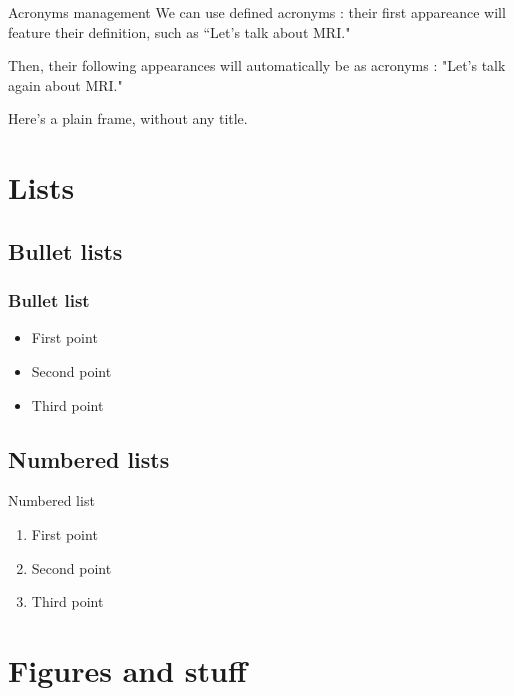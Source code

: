 \documentclass[
  11pt, %
  aspectratio=169, %
]{beamer}
\begin{document}
\begin{frame}{Acronyms management}
  We can use defined acronyms : their first appareance will feature their definition, such as “Let's talk about \ac{MRI}."
  \vfill

  Then, their following appearances will automatically be as acronyms : "Let's talk again about \ac{MRI}."
\end{frame}

\begin{frame}

  Here’s a plain frame, without any title.

\end{frame}

\section{Lists}

\subsection{Bullet lists}
\begin{frame}
  \frametitle{Bullet list}

  \begin{itemize}
    \item First point
    \item Second point
    \item Third point
  \end{itemize}

\end{frame}

\subsection{Numbered lists}
\begin{frame}{Numbered list}
  \begin{enumerate}
    \item First point
    \item Second point
    \item Third point
  \end{enumerate}

\end{frame}

\section{Figures and stuff}
\end{document}
